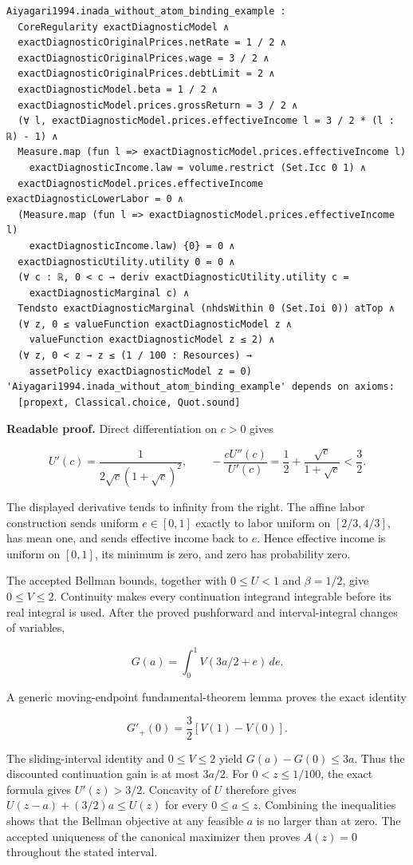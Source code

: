 \documentclass[
  11pt,
]{article}
\begin{document}
\begin{verbatim}
Aiyagari1994.inada_without_atom_binding_example :
  CoreRegularity exactDiagnosticModel ∧
  exactDiagnosticOriginalPrices.netRate = 1 / 2 ∧
  exactDiagnosticOriginalPrices.wage = 3 / 2 ∧
  exactDiagnosticOriginalPrices.debtLimit = 2 ∧
  exactDiagnosticModel.beta = 1 / 2 ∧
  exactDiagnosticModel.prices.grossReturn = 3 / 2 ∧
  (∀ l, exactDiagnosticModel.prices.effectiveIncome l = 3 / 2 * (l : ℝ) - 1) ∧
  Measure.map (fun l => exactDiagnosticModel.prices.effectiveIncome l)
    exactDiagnosticIncome.law = volume.restrict (Set.Icc 0 1) ∧
  exactDiagnosticModel.prices.effectiveIncome exactDiagnosticLowerLabor = 0 ∧
  (Measure.map (fun l => exactDiagnosticModel.prices.effectiveIncome l)
    exactDiagnosticIncome.law) {0} = 0 ∧
  exactDiagnosticUtility.utility 0 = 0 ∧
  (∀ c : ℝ, 0 < c → deriv exactDiagnosticUtility.utility c =
    exactDiagnosticMarginal c) ∧
  Tendsto exactDiagnosticMarginal (nhdsWithin 0 (Set.Ioi 0)) atTop ∧
  (∀ z, 0 ≤ valueFunction exactDiagnosticModel z ∧
    valueFunction exactDiagnosticModel z ≤ 2) ∧
  (∀ z, 0 < z → z ≤ (1 / 100 : Resources) →
    assetPolicy exactDiagnosticModel z = 0)
'Aiyagari1994.inada_without_atom_binding_example' depends on axioms:
  [propext, Classical.choice, Quot.sound]
\end{verbatim}

\textbf{Readable proof.} Direct differentiation on \(c>0\) gives

\[U'(c)=\frac{1}{2\sqrt c(1+\sqrt c)^2},\qquad
-\frac{cU''(c)}{U'(c)}=\frac12+\frac{\sqrt c}{1+\sqrt c}<\frac32.\]

The displayed derivative tends to infinity from the right. The affine
labor construction sends uniform \(e\in[0,1]\) exactly to labor uniform
on \([2/3,4/3]\), has mean one, and sends effective income back to
\(e\). Hence effective income is uniform on \([0,1]\), its minimum is
zero, and zero has probability zero.

The accepted Bellman bounds, together with \(0\leq U<1\) and
\(\beta=1/2\), give \(0\leq V\leq2\). Continuity makes every
continuation integrand integrable before its real integral is used.
After the proved pushforward and interval-integral changes of variables,

\[G(a)=\int_0^1V(3a/2+e)\,de.\]

A generic moving-endpoint fundamental-theorem lemma proves the exact
identity

\[G'_+(0)=\frac32[V(1)-V(0)].\]

The sliding-interval identity and \(0\leq V\leq2\) yield
\(G(a)-G(0)\leq3a\). Thus the discounted continuation gain is at most
\(3a/2\). For \(0<z\leq1/100\), the exact formula gives \(U'(z)>3/2\).
Concavity of \(U\) therefore gives \(U(z-a)+(3/2)a\leq U(z)\) for every
\(0\leq a\leq z\). Combining the inequalities shows that the Bellman
objective at any feasible \(a\) is no larger than at zero. The accepted
uniqueness of the canonical maximizer then proves \(A(z)=0\) throughout
the stated interval.
\end{document}
